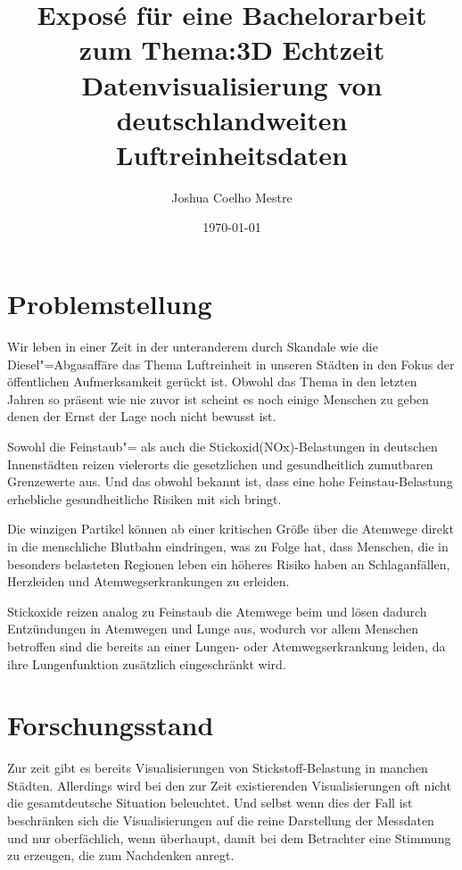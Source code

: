 \documentclass[12pt]{article} %
\title{Exposé für eine Bachelorarbeit zum Thema:\newline 3D Echtzeit Datenvisualisierung von deutschlandweiten Luftreinheitsdaten}
\author{Joshua Coelho Mestre}
\date{\today} %
\begin{document}
\maketitle
\newpage
\tableofcontents %
\newpage %

\section{Problemstellung} \label{sec:Problemstellung}

Wir leben in einer Zeit in der unteranderem durch Skandale wie die Diesel"=Abgasaffäre das Thema Luftreinheit in unseren Städten in den Fokus der öffentlichen Aufmerksamkeit gerückt ist.
Obwohl das Thema in den letzten Jahren so präsent wie nie zuvor ist scheint es noch einige Menschen zu geben denen der Ernst der Lage noch nicht bewusst ist.

Sowohl die Feinstaub"= als auch die Stickoxid(NOx)-Belastungen in deutschen Innenstädten reizen vielerorts die gesetzlichen und gesundheitlich zumutbaren Grenzewerte aus. Und das obwohl bekannt ist, dass eine hohe Feinstau-Belastung erhebliche gesundheitliche Risiken mit sich bringt.

Die winzigen Partikel können ab einer kritischen Größe über die Atemwege direkt in die menschliche Blutbahn eindringen, was zu Folge hat, dass Menschen, die in besonders belasteten Regionen leben ein höheres Risiko haben an Schlaganfällen, Herzleiden und Atemwegserkrankungen zu erleiden.

Stickoxide reizen analog zu Feinstaub die Atemwege beim und lösen dadurch Entzündungen in Atemwegen und Lunge aus, wodurch vor allem Menschen betroffen sind die bereits an einer Lungen- oder Atemwegserkrankung leiden, da ihre Lungenfunktion zusätzlich eingeschränkt wird.\cite{zo:StickoxideUndFeinstaub}

\section{Forschungsstand} \label{sec:Forschungsstand}

Zur zeit gibt es bereits Visualisierungen von Stickstoff-Belastung in manchen Städten. 
Allerdings wird bei den zur Zeit existierenden Visualisierungen oft nicht die gesamtdeutsche Situation beleuchtet.
Und selbst wenn dies der Fall ist beschränken sich die Visualisierungen auf die reine Darstellung der Messdaten und nur oberfächlich, wenn überhaupt, damit bei dem Betrachter eine Stimmung zu erzeugen, die zum Nachdenken anregt.
\end{document}

